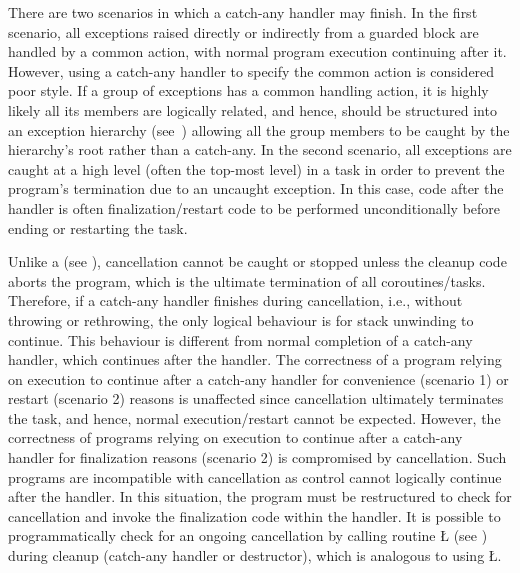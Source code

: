 \documentclass[openright,twoside]{report}
\begin{document}
There are two scenarios in which a catch-any handler may finish.
In the first scenario, all exceptions raised directly or indirectly from a guarded block are handled by a common action, with normal program execution continuing after it.
However, using a catch-any handler to specify the common action is considered poor style.
If a group of exceptions has a common handling action, it is highly likely all its members are logically related, and hence, should be structured into an exception hierarchy (see~) allowing all the group members to be caught by the hierarchy's root rather than a catch-any.
In the second scenario, all exceptions are caught at a high level (often the top-most level) in a task in order to prevent the program's termination due to an uncaught exception.
In this case, code after the handler is often finalization/restart code to be performed unconditionally before ending or restarting the task.

Unlike a  (see ), cancellation cannot be caught or stopped unless the cleanup code aborts the program, which is the ultimate termination of all coroutines/tasks.
Therefore, if a catch-any handler finishes during cancellation, i.e., without throwing or rethrowing, the only logical behaviour is for stack unwinding to continue.
This behaviour is different from normal completion of a catch-any handler, which continues after the handler.
The correctness of a program relying on execution to continue after a catch-any handler for convenience (scenario 1) or restart (scenario 2) reasons is unaffected since cancellation ultimately terminates the task, and hence, normal execution/restart cannot be expected.
However, the correctness of programs relying on execution to continue after a catch-any handler for finalization reasons (scenario 2) is compromised by cancellation.
Such programs are incompatible with cancellation as control cannot logically continue after the handler.
In this situation, the program must be restructured to check for cancellation and invoke the finalization code within the handler.
It is possible to programmatically check for an ongoing cancellation by calling routine \LGinlinetrue\LGbegin\lgrinde\L{}\endlgrinde\LGend{} (see ) during cleanup (catch-any handler or destructor), which is analogous to using \LGinlinetrue\LGbegin\lgrinde\L{}\endlgrinde\LGend{}.
\end{document}
